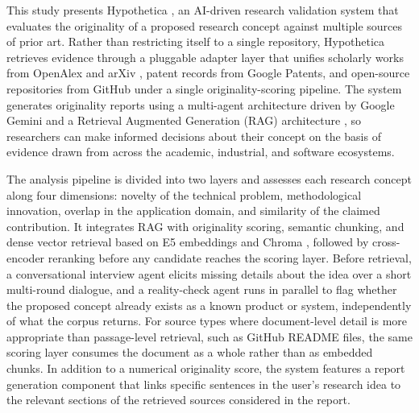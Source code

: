 This study presents Hypothetica \citep{hypotheticaGitHub}, an AI-driven research validation system that evaluates the originality of a proposed research concept against multiple sources of prior art. Rather than restricting itself to a single repository, Hypothetica retrieves evidence through a pluggable adapter layer that unifies scholarly works from OpenAlex \citep{openalexDocs,priem2022openalex} and arXiv \citep{arxivAPI}, patent records from Google Patents, and open-source repositories from GitHub under a single originality-scoring pipeline. The system generates originality reports using a multi-agent architecture driven by Google Gemini \citep{geminiAPI} and a Retrieval Augmented Generation (RAG) architecture \citep{lewis2020rag,gao2024ragsurvey}, so researchers can make informed decisions about their concept on the basis of evidence drawn from across the academic, industrial, and software ecosystems.

The analysis pipeline is divided into two layers and assesses each research concept along four dimensions: novelty of the technical problem, methodological innovation, overlap in the application domain, and similarity of the claimed contribution. It integrates RAG with originality scoring, semantic chunking, and dense vector retrieval based on E5 embeddings \citep{wang2022e5} and Chroma \citep{chroma}, followed by cross-encoder reranking \citep{nogueira2019monobert} before any candidate reaches the scoring layer. Before retrieval, a conversational interview agent elicits missing details about the idea over a short multi-round dialogue, and a reality-check agent runs in parallel to flag whether the proposed concept already exists as a known product or system, independently of what the corpus returns. For source types where document-level detail is more appropriate than passage-level retrieval, such as GitHub README files, the same scoring layer consumes the document as a whole rather than as embedded chunks. In addition to a numerical originality score, the system features a report generation component that links specific sentences in the user's research idea to the relevant sections of the retrieved sources considered in the report.

